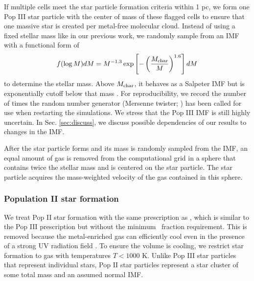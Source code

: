 \documentclass[apj]{emulateapj}
\begin{document}
If multiple cells meet the star particle formation criteria within 1
pc, we form one Pop III star particle with the center of mass of these
flagged cells to ensure that one massive star is created per
metal-free molecular cloud.  Instead of using a fixed stellar mass
like in our previous work, we randomly sample from an IMF with a
functional form of
%
\begin{equation}
\label{eqn:imf}
f(\log M) dM = M^{-1.3} \exp\left[-\left(\frac{M_{\rm
      char}}{M}\right)^{1.6}\right] dM
\end{equation}
%
to determine the stellar mass.  Above $M_{\rm char}$, it behaves as a
Salpeter IMF but is exponentially cutoff below that mass
\citep{Chabrier03, Clark09}.  For reproducibility, we record the
number of times the random number generator (Mersenne twister;
\citet{MTwister}) has been called for use when restarting the
simulations.  We stress that the Pop III IMF is still highly
uncertain.  In Sec. \ref{sec:discuss}, we discuss possible
dependencies of our results to changes in the IMF.  

After the star particle forms and its mass is randomly sampled from
the IMF, an equal amount of gas is removed from the computational grid
in a sphere that contains twice the stellar mass and is centered on
the star particle.  The star particle acquires the mass-weighted
velocity of the gas contained in this sphere.

%

\subsubsection{Population II star formation}

We treat Pop II star formation with the same prescription as
\citet{Wise09}, which is similar to the Pop III prescription but
without the minimum \hh~fraction requirement.  This is removed because
the metal-enriched gas can efficiently cool even in the presence of a
strong UV radiation field \citep[e.g.][]{Safranek10}.  To ensure the
volume is cooling, we restrict star formation to gas with temperatures
$T < 1000$ K.  Unlike Pop III star particles that represent individual
stars, Pop II star particles represent a star cluster of some total
mass and an assumed normal IMF.
\end{document}
